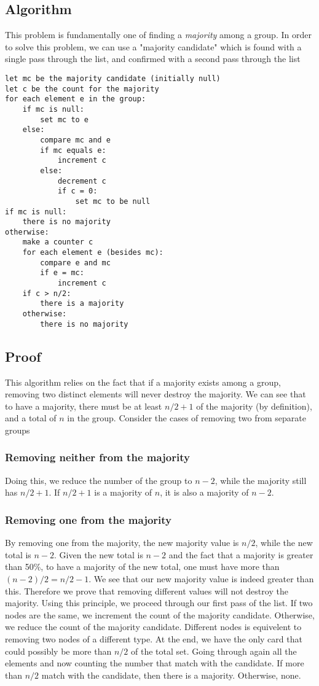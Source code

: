 \documentclass[titlepage]{article}
\numberwithin{equation}{subsection}
\begin{document}
\subsection{Algorithm}
This problem is fundamentally one of finding a \textit{majority} among a group. In order to solve this problem,
we can use a "majority candidate" which is found with a single pass through the list, and confirmed with a
second pass through the list
\begin{minipage}{\linewidth}
\begin{lstlisting}
let mc be the majority candidate (initially null)
let c be the count for the majority
for each element e in the group:
    if mc is null:
        set mc to e
    else:
        compare mc and e
        if mc equals e:
            increment c
        else:
            decrement c
            if c = 0:
                set mc to be null
if mc is null:
    there is no majority
otherwise:
    make a counter c
    for each element e (besides mc):
        compare e and mc
        if e = mc:
            increment c
    if c > n/2:
        there is a majority
    otherwise:
        there is no majority
\end{lstlisting}
\end{minipage}
\subsection{Proof}
This algorithm relies on the fact that if a majority exists among a group, removing two distinct elements
will never destroy the majority. We can see that to have a majority, there must be at least $n/2+1$ of the
majority (by definition), and a total of $n$ in the group. Consider the cases of removing two from separate groups
\subsubsection{Removing neither from the majority}
Doing this, we reduce the number of the group to $n-2$, while the majority still has $n/2+1$. If $n/2+1$ is a
majority of $n$, it is also a majority of $n-2$.
\subsubsection{Removing one from the majority}
By removing one from the majority, the new majority value is $n/2$, while the new total is $n-2$. Given the new
total is $n-2$ and the fact that a majority is greater than 50\%, to have a majority of the new total, one
must have more than $(n-2)/2 = n/2 - 1$. We see that our new majority value is indeed greater than this. Therefore
we prove that removing different values will not destroy the majority. Using this principle, we proceed through
our first pass of the list. If two nodes are the same, we increment the count of the majority candidate. Otherwise,
we reduce the count of the majority candidate. Different nodes is equivelent to removing two nodes of a different type.
At the end, we have the only card that could possibly be more than $n/2$ of the total set. Going through again
all the elements and now counting the number that match with the candidate. If more than $n/2$ match with the
candidate, then there is a majority. Otherwise, none.
\end{document}
